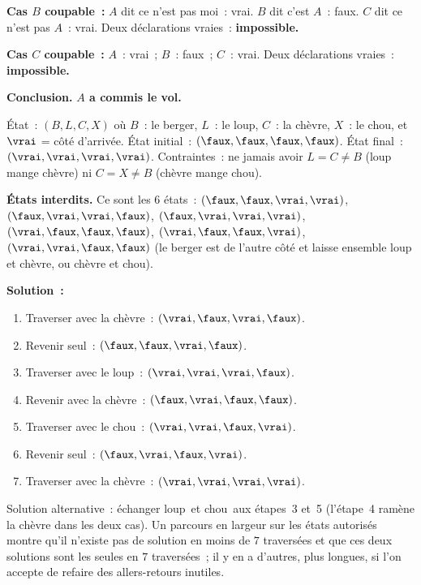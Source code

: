 \textbf{Cas $B$ coupable~:} $A$ dit \og ce n'est pas moi\fg~: vrai.
$B$ dit \og c'est $A$\fg~: faux.
$C$ dit \og ce n'est pas $A$\fg~: vrai.
Deux d\'eclarations vraies~: \textbf{impossible.}

\textbf{Cas $C$ coupable~:} $A$~: vrai~; $B$~: faux~; $C$~: vrai.
Deux d\'eclarations vraies~: \textbf{impossible.}

\textbf{Conclusion.} \textbf{$A$ a commis le vol.}


\'Etat~: $(B,L,C,X)$ o\`u $B$~: \og le berger\fg, $L$~: \og le loup\fg,
$C$~: \og la ch\`evre\fg, $X$~: \og le chou\fg, et $\vrai$ = c\^ot\'e d'arriv\'ee.
\'Etat initial~: $(\faux,\faux,\faux,\faux)$.
\'Etat final~: $(\vrai,\vrai,\vrai,\vrai)$.
Contraintes~: ne jamais avoir $L=C\ne B$ (loup mange ch\`evre)
ni $C=X\ne B$ (ch\`evre mange chou).

\textbf{\'Etats interdits.} Ce sont les $6$ \'etats~:
$(\faux,\faux,\vrai,\vrai)$, $(\faux,\vrai,\vrai,\faux)$, $(\faux,\vrai,\vrai,\vrai)$,
$(\vrai,\faux,\faux,\faux)$, $(\vrai,\faux,\faux,\vrai)$, $(\vrai,\vrai,\faux,\faux)$
(le berger est de l'autre c\^ot\'e et laisse ensemble loup et ch\`evre, ou ch\`evre et chou).

\textbf{Solution~:}
\begin{enumerate}
  \item Traverser avec la ch\`evre~: $(\vrai,\faux,\vrai,\faux)$.
  \item Revenir seul~: $(\faux,\faux,\vrai,\faux)$.
  \item Traverser avec le loup~: $(\vrai,\vrai,\vrai,\faux)$.
  \item Revenir avec la ch\`evre~: $(\faux,\vrai,\faux,\faux)$.
  \item Traverser avec le chou~: $(\vrai,\vrai,\faux,\vrai)$.
  \item Revenir seul~: $(\faux,\vrai,\faux,\vrai)$.
  \item Traverser avec la ch\`evre~: $(\vrai,\vrai,\vrai,\vrai)$.
\end{enumerate}
Solution alternative~: \'echanger \og loup\fg\ et \og chou\fg\ aux \'etapes~3 et~5
(l'\'etape~4 ram\`ene la ch\`evre dans les deux cas).
Un parcours en largeur sur les \'etats autoris\'es montre qu'il n'existe pas de solution en moins de $7$ travers\'ees
et que ces deux solutions sont les seules en $7$ travers\'ees~; il y en a d'autres, plus longues,
si l'on accepte de refaire des allers-retours inutiles.

